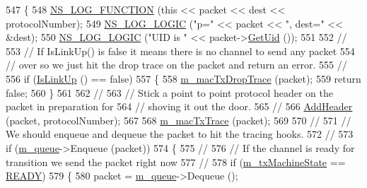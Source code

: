 \begin{DoxyCode}
547 \{
548   \hyperlink{log-macros-disabled_8h_a90b90d5bad1f39cb1b64923ea94c0761}{NS\_LOG\_FUNCTION} (\textcolor{keyword}{this} << packet << dest << protocolNumber);
549   \hyperlink{group__logging_ga88acd260151caf2db9c0fc84997f45ce}{NS\_LOG\_LOGIC} (\textcolor{stringliteral}{"p="} << packet << \textcolor{stringliteral}{", dest="} << &dest);
550   \hyperlink{group__logging_ga88acd260151caf2db9c0fc84997f45ce}{NS\_LOG\_LOGIC} (\textcolor{stringliteral}{"UID is "} << packet->\hyperlink{classns3_1_1Packet_a1f212c825b50e54d94f5b9ae99592e6a}{GetUid} ());
551 
552   \textcolor{comment}{//}
553   \textcolor{comment}{// If IsLinkUp() is false it means there is no channel to send any packet }
554   \textcolor{comment}{// over so we just hit the drop trace on the packet and return an error.}
555   \textcolor{comment}{//}
556   \textcolor{keywordflow}{if} (\hyperlink{classns3_1_1PointToPointNetDevice_ae60bd9da84487cd401ff5ade4c5d51fb}{IsLinkUp} () == \textcolor{keyword}{false})
557     \{
558       \hyperlink{classns3_1_1PointToPointNetDevice_ae8c1d85f19dd5ae51c2ec0bde51f716d}{m\_macTxDropTrace} (packet);
559       \textcolor{keywordflow}{return} \textcolor{keyword}{false};
560     \}
561 
562   \textcolor{comment}{//}
563   \textcolor{comment}{// Stick a point to point protocol header on the packet in preparation for}
564   \textcolor{comment}{// shoving it out the door.}
565   \textcolor{comment}{//}
566   \hyperlink{classns3_1_1PointToPointNetDevice_a041de407f1f7fac39ba2c961f857fedb}{AddHeader} (packet, protocolNumber);
567 
568   \hyperlink{classns3_1_1PointToPointNetDevice_a1f915201c9a40e6221a61477590ddfef}{m\_macTxTrace} (packet);
569 
570   \textcolor{comment}{//}
571   \textcolor{comment}{// We should enqueue and dequeue the packet to hit the tracing hooks.}
572   \textcolor{comment}{//}
573   \textcolor{keywordflow}{if} (\hyperlink{classns3_1_1PointToPointNetDevice_accb023eb99ce542c5a33bb5e79b7c2eb}{m\_queue}->Enqueue (packet))
574     \{
575       \textcolor{comment}{//}
576       \textcolor{comment}{// If the channel is ready for transition we send the packet right now}
577       \textcolor{comment}{// }
578       \textcolor{keywordflow}{if} (\hyperlink{classns3_1_1PointToPointNetDevice_ad5896856f00b39aa0cc090f2e1a1e184}{m\_txMachineState} == \hyperlink{classns3_1_1PointToPointNetDevice_a963e2da767f0ac1b49a74eeb7b63e417a462ad9faf8cb8b62bc498f336befcb6a}{READY})
579         \{
580           packet = \hyperlink{classns3_1_1PointToPointNetDevice_accb023eb99ce542c5a33bb5e79b7c2eb}{m\_queue}->Dequeue ();

\end{DoxyCode}
